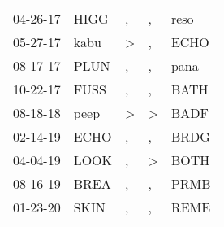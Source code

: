 \begin{supertabular}{lllll}
 04-26-17 &   HIGG &             , &             , &   reso \\
 05-27-17 &   kabu &  \textgreater &             , &   ECHO \\
 08-17-17 &   PLUN &             , &             , &   pana \\
 10-22-17 &   FUSS &             , &             , &   BATH \\
 08-18-18 &   peep &  \textgreater &  \textgreater &   BADF \\
 02-14-19 &   ECHO &             , &             , &   BRDG \\
 04-04-19 &   LOOK &             , &  \textgreater &   BOTH \\
 08-16-19 &   BREA &             , &             , &   PRMB \\
 01-23-20 &   SKIN &             , &             , &   REME \\
\end{supertabular}

